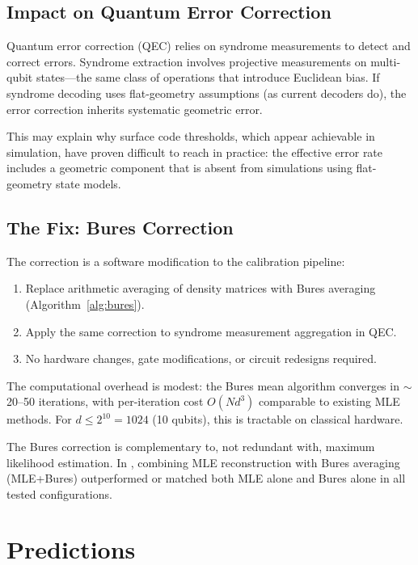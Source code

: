 \documentclass[12pt,a4paper]{article}
\begin{document}
\subsection{Impact on Quantum Error Correction}

Quantum error correction (QEC) \cite{shor1995,steane1996} relies on syndrome measurements to detect and correct errors. Syndrome extraction involves projective measurements on multi-qubit states---the same class of operations that introduce Euclidean bias. If syndrome decoding uses flat-geometry assumptions (as current decoders do), the error correction inherits systematic geometric error.

This may explain why surface code thresholds, which appear achievable in simulation, have proven difficult to reach in practice: the effective error rate includes a geometric component that is absent from simulations using flat-geometry state models.

\subsection{The Fix: Bures Correction}

The correction is a software modification to the calibration pipeline:
\begin{enumerate}
    \item Replace arithmetic averaging of density matrices with Bures averaging (Algorithm~\ref{alg:bures}).
    \item Apply the same correction to syndrome measurement aggregation in QEC.
    \item No hardware changes, gate modifications, or circuit redesigns required.
\end{enumerate}

The computational overhead is modest: the Bures mean algorithm converges in $\sim$20--50 iterations, with per-iteration cost $O(Nd^3)$ comparable to existing MLE methods. For $d \leq 2^{10} = 1024$ (10 qubits), this is tractable on classical hardware.

The Bures correction is complementary to, not redundant with, maximum likelihood estimation. In \cite{muir2026}, combining MLE reconstruction with Bures averaging (MLE+Bures) outperformed or matched both MLE alone and Bures alone in all tested configurations.

\section{Predictions}
\label{sec:predictions}
\end{document}
